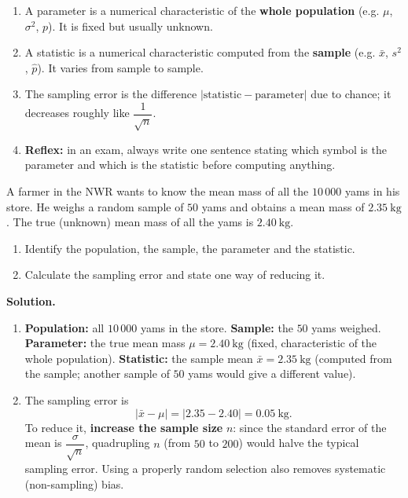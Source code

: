 \documentclass[11pt]{article}
\newcommand{\cle}[1]{{\popxbold\color{popdark}#1}}
\begin{document}
\begin{methode}
\begin{enumerate}
\item A \cle{parameter} is a numerical characteristic of the \textbf{whole population} (e.g. $\mu$, $\sigma^2$, $p$). It is fixed but usually unknown.
\item A \cle{statistic} is a numerical characteristic computed from the \textbf{sample} (e.g. $\bar{x}$, $s^2$, $\hat{p}$). It varies from sample to sample.
\item The \cle{sampling error} is the difference $|\text{statistic}-\text{parameter}|$ due to chance; it decreases roughly like $\dfrac{1}{\sqrt{n}}$.
\item \textbf{Reflex:} in an exam, always write one sentence stating which symbol is the parameter and which is the statistic before computing anything.
\end{enumerate}
\end{methode}

\begin{exoresolu}
A farmer in the NWR wants to know the mean mass of all the $10\,000$ yams in his store. He weighs a random sample of $50$ yams and obtains a mean mass of $2.35\ \mathrm{kg}$. The true (unknown) mean mass of all the yams is $2.40\ \mathrm{kg}$.
\begin{enumerate}
\item Identify the population, the sample, the parameter and the statistic.
\item Calculate the sampling error and state one way of reducing it.
\end{enumerate}
\tcblower
\textbf{Solution.}
\begin{enumerate}
\item \textbf{Population:} all $10\,000$ yams in the store. \textbf{Sample:} the $50$ yams weighed. \textbf{Parameter:} the true mean mass $\mu = 2.40\ \mathrm{kg}$ (fixed, characteristic of the whole population). \textbf{Statistic:} the sample mean $\bar{x}=2.35\ \mathrm{kg}$ (computed from the sample; another sample of $50$ yams would give a different value).
\item The sampling error is
\[
|\bar{x}-\mu| = |2.35-2.40| = 0.05\ \mathrm{kg}.
\]
To reduce it, \textbf{increase the sample size} $n$: since the standard error of the mean is $\dfrac{\sigma}{\sqrt{n}}$, quadrupling $n$ (from $50$ to $200$) would halve the typical sampling error. Using a properly random selection also removes systematic (non-sampling) bias.
\end{enumerate}
\end{exoresolu}
\end{document}

